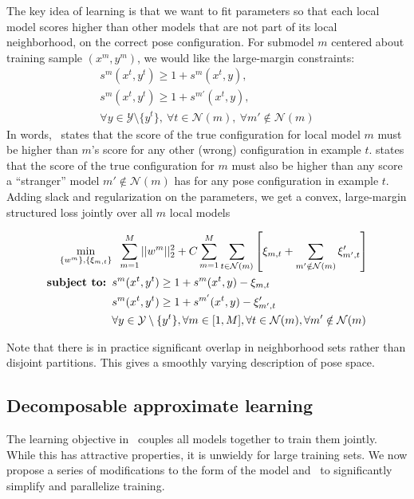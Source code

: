 The key idea of learning is that we want to fit parameters so that each local 
model scores higher than other models that are not part of its local 
neighborhood, on the correct pose configuration.  For submodel $m$ centered 
about training sample $(x^m,y^m)$, we would like the large-margin constraints:
\begin{align}
s^m(x^t,y^t) \geq 1 + s^{m}(x^t,y), \label{eq:c1}\\
s^m(x^t,y^t) \geq 1 + s^{m'}(x^t,y),\label{eq:c2}\\
\forall y \in \mathcal{Y}\setminus \{y^t\},~\forall t \in 
\mathcal{N}(m),~\forall m' \notin \mathcal{N}(m) \nonumber
\end{align}
In words,~ states that the score of the true configuration for local 
model $m$ must be higher than $m$'s score for any other (wrong) configuration 
in example $t$.   states that the score of the true configuration 
for $m$ must also be higher than any score a ``stranger'' model $m' \notin 
\mathcal{N}(m)$ has for any pose configuration in example $t$.  Adding slack 
and regularization on the parameters, we get a convex, large-margin structured 
loss jointly over all $m$ local models

\begin{align}\label{eq:full-learn}
\min_{\{w^m\}, \{\xi_{m,t}\}}& \;\; \sum_{m=1}^M ||w^m||_2^2 + C \sum_{m=1}^M 
\sum_{t \in \mathcal{N}(m)} \left[ \xi_{m,t} + \sum_{m' \notin \mathcal{N}(m)} 
\xi'_{m',t} \right] \\
\text{\bf{subject to:} }
&s^m(x^t,y^t) \geq 1 + s^{m}(x^t,y) - \xi_{m,t}\\
&s^m(x^t,y^t) \geq 1 + s^{m'}(x^t,y) - \xi'_{m',t}\\
&\forall y \in \mathcal{Y}\setminus \{y^t\}, \forall m \in [1,M], \forall t \in 
\mathcal{N}(m), \forall m' \notin \mathcal{N}(m) \nonumber \end{align}

Note that there is in practice significant overlap in neighborhood sets rather than disjoint partitions.  This gives a smoothly varying description of pose space.

\subsection{Decomposable approximate learning}
The learning objective in~ couples all models together to 
train them jointly.  While this has attractive properties, it is unwieldy for 
large training sets.  We now propose a series of modifications to the form of 
the model and~ to significantly simplify and parallelize 
training.


